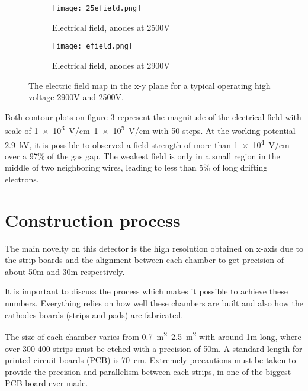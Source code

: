 \begin{figure}[ht]
		\centering
		\hspace*{\fill}
		\begin{subfigure}[b]{0.45\textwidth}
			\centering
			\texttt{[image: 25efield.png]}
			\caption{Electrical field, anodes at 2500V}\label{fig:25efield}
		\end{subfigure}
		\hfill
		\begin{subfigure}[b]{0.45\textwidth}
			\centering
			\texttt{[image: efield.png]}
			\caption{Electrical field, anodes at 2900V}\label{fig:efield}
		\end{subfigure}
		\hspace*{\fill}
		\centering
		\caption{The electric field map in the x-y plane for a typical operating high voltage 2900V and 2500V.}\label{fig:efields}
\end{figure}

Both contour plots on figure \ref{fig:efields} represent the magnitude of the electrical field with scale of
\SIrange{1e3}{1e5}{V/cm} with 50 steps. At the working potential \SI{2.9}{kV}, it is possible to observed a field
strength of  more than \SI{1e4}{V/cm} over a 97\% of the gas gap. The weakest field is only in a small region in the
middle of two neighboring wires, leading to less than 5\% of long drifting electrons. 


\section{Construction process}

The main novelty on this detector is the high resolution obtained on x-axis due to the strip boards and the alignment
between each chamber to get precision of about 50\micro m and 30\micro m respectively.\par 

It is important to discuss the process which makes it possible to achieve these numbers. Everything relies on how well
these chambers are built and also how the cathodes
boards (strips and pads) are fabricated.\par 

The size of each chamber varies from \SIrange{0.7}{2.5}{m^2} with around 1m long, where over 300-400 strips must be
etched with a precision of 50\micro m. A standard length for printed circuit boards (PCB) is \SI{70}{cm}.  Extremely
precautions must be taken to provide the precision and parallelism between each strips, in one of the biggest PCB board
ever made.\par

